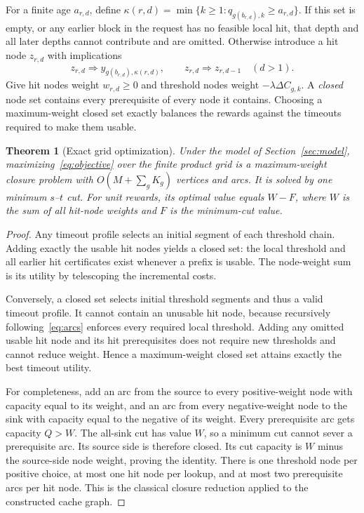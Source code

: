 \documentclass[11pt,a4paper]{article}
\newtheorem{theorem}{Theorem}
\begin{document}
For a finite age $a_{r,d}$, define
$\kappa(r,d)=\min\{k\geq1:q_{g(b_{r,d}),k}\geq a_{r,d}\}$.
If this set is empty, or any earlier block in the request has no feasible local
hit, that depth and all later depths cannot contribute and are omitted.
Otherwise introduce a hit node $z_{r,d}$ with implications
\begin{equation}
 z_{r,d}\Rightarrow y_{g(b_{r,d}),\kappa(r,d)},\qquad
 z_{r,d}\Rightarrow z_{r,d-1}\quad(d>1).\label{eq:arcs}
\end{equation}
Give hit nodes weight $w_{r,d}\geq0$ and threshold nodes weight
$-\lambda\Delta C_{g,k}$. A \emph{closed} node set contains every prerequisite
of every node it contains. Choosing a maximum-weight closed set exactly balances
the rewards against the timeouts required to make them usable.

\begin{theorem}[Exact grid optimization]\label{thm:cut}
Under the model of Section~\ref{sec:model}, maximizing~\eqref{eq:objective} over
the finite product grid is a maximum-weight closure problem with
$O(M+\sum_g K_g)$ vertices and arcs. It is solved by one minimum $s$--$t$ cut.
For unit rewards, its optimal value equals $W-F$, where $W$ is the sum of all
hit-node weights and $F$ is the minimum-cut value.
\end{theorem}
\begin{proof}
Any timeout profile selects an initial segment of each threshold chain. Adding
exactly the usable hit nodes yields a closed set: the local threshold and all
earlier hit certificates exist whenever a prefix is usable. The node-weight sum
is its utility by telescoping the incremental costs.

Conversely, a closed set selects initial threshold segments and thus a valid
timeout profile. It cannot contain an unusable hit node, because recursively
following~\eqref{eq:arcs} enforces every required local threshold. Adding any
omitted usable hit node and its hit prerequisites does not require new thresholds
and cannot reduce weight. Hence a maximum-weight closed set attains exactly the
best timeout utility.

For completeness, add an arc from the source to every positive-weight node with
capacity equal to its weight, and an arc from every negative-weight node to the
sink with capacity equal to the negative of its weight. Every prerequisite arc
gets capacity $Q>W$. The all-sink cut has value $W$, so a minimum cut cannot sever
a prerequisite arc. Its source side is therefore closed. Its cut capacity is
$W$ minus the source-side node weight, proving the identity. There is one
threshold node per positive choice, at most one hit node per lookup, and at most
two prerequisite arcs per hit node. This is the classical closure reduction
\cite{picard} applied to the constructed cache graph.
\end{proof}
\end{document}
